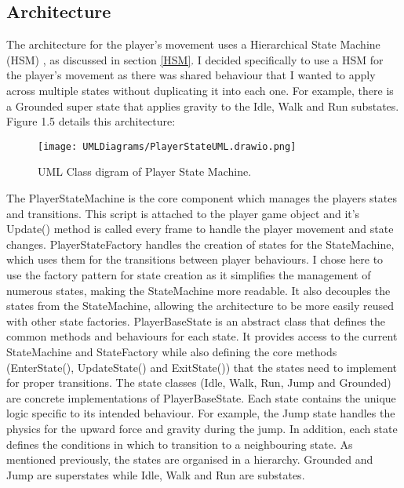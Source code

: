 \documentclass[]{final_report}
\begin{document}
\subsection{Architecture}
The architecture for the player's movement uses a Hierarchical State Machine (HSM) , as discussed in section \ref{HSM}.  I decided specifically to use a HSM for the player's movement as there was shared behaviour that I wanted to apply across multiple states without duplicating it into each one.  For example, there is a Grounded super state that applies gravity to the Idle, Walk and Run substates. Figure 1.5 details this architecture:
\begin{figure}[h!]
    \centering
    \texttt{[image: UMLDiagrams/PlayerStateUML.drawio.png]}
    \caption{UML Class digram of Player State Machine.}
    \label{fig:label_State}
\end{figure}
\newline The PlayerStateMachine is the core component which manages the players states and transitions. This script is attached to the player game object and it's Update() method is called every frame to handle the player movement and state changes. PlayerStateFactory handles the creation of states for the StateMachine, which uses them for the transitions between player behaviours. I chose here to use the factory pattern for state creation as it simplifies the management of numerous states, making the StateMachine more readable. It also decouples the states from the StateMachine, allowing the architecture to be more easily reused with other state factories. PlayerBaseState is an abstract class that defines the common methods and behaviours for each state.  It provides access to the current StateMachine and StateFactory while also defining the core methods (EnterState(), UpdateState() and ExitState()) that the states need to implement for proper transitions. The state classes (Idle, Walk, Run, Jump and Grounded) are concrete implementations of PlayerBaseState. Each state contains the unique logic specific to its intended behaviour. For example, the Jump state handles the physics for the upward force and gravity during the jump. In addition, each state defines the conditions in which to transition to a neighbouring state. As mentioned previously, the states are organised in a hierarchy. Grounded and Jump are superstates while Idle, Walk and Run are substates. 
\end{document}
